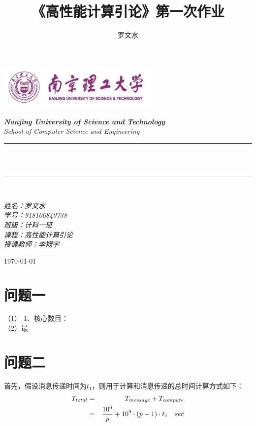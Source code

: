 \documentclass[12pt]{article}
\title{《高性能计算引论》第一次作业}
\author{\textup{罗文水}}
\begin{document}
	
	\begin{titlepage}
		\newcommand{\HRule}{\rule{\linewidth}{0.5mm}}
		\includegraphics[width=8cm]{title}\\[1cm] 
		\center 
		\quad\\[1.5cm]
		\textsl{\Large \textbf{Nanjing University of Science and Technology} }\\[0.5cm] 
		\textsl{\large School of Computer Science and Engineering}\\[0.5cm] 
		\makeatletter
		\HRule \\[0.4cm]
		{ \huge \bfseries \@title}\\[0.25cm] 
		\HRule \\[1.5cm]
	\begin{minipage}{0.42\textwidth}
		\begin{flushleft}
			
			\Large{\emph{姓名：罗文水}}
			\\
			\Large{\emph{学号：918106840738}}
			\\
			\Large{\emph{班级：计科一班}}
			\\
			\Large{\emph{课程：高性能计算引论}}
			\\
			\Large{\emph{授课教师：李翔宇}}
			\\
		\end{flushleft}
	\end{minipage}
		\vspace{7em} 
		
		{\large \today}\\[2cm] 
		\vfill 
	\end{titlepage}
	
	\newpage
\section{问题一}
	（1） 1、核心数目：\\

	（2）最\\
	
\section{问题二}

	首先，假设消息传递时间为$t_1$，则用于计算和消息传递的总时间计算方式如下：
\begin{eqnarray}\label{px}
	T_{total}&=&T_{message}+T_{compute}\\ \notag
	&=&
	\frac{10^{6}}{p}+10^{9}\cdot(p-1)\cdot t_1 \quad sec
\end{eqnarray}
\end{document}
